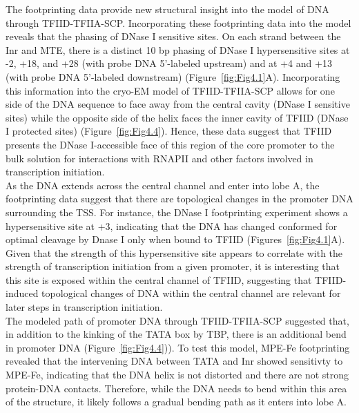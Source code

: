 \indent The footprinting data provide new structural insight into the model of DNA through TFIID-TFIIA-SCP. Incorporating these footprinting data into the model reveals that the phasing of DNase I sensitive sites. On each strand between the Inr and MTE, there is a distinct 10 bp phasing of DNase I hypersensitive sites at -2, +18, and +28 (with probe DNA 5’-labeled upstream) and at +4 and +13 (with probe DNA 5’-labeled downstream) (Figure~\ref{fig:Fig4.1}A).  Incorporating this information into the cryo-EM model of TFIID-TFIIA-SCP allows for one side of the DNA sequence to face away from the central cavity (DNase I sensitive sites) while the opposite side of the helix faces the inner cavity of TFIID (DNase I protected sites) (Figure~\ref{fig:Fig4.4}). Hence, these data suggest that TFIID presents the DNase I-accessible face of this region of the core promoter to the bulk solution for interactions with RNAPII and other factors involved in transcription initiation. \\
\indent As the DNA extends across the central channel and enter into lobe A, the footprinting data suggest that there are topological changes in the promoter DNA surrounding the TSS. For instance, the DNase I footprinting experiment shows a hypersensitive site at +3, indicating that the DNA has changed conformed for optimal cleavage by Dnase I only when bound to TFIID (Figures~\ref{fig:Fig4.1}A). Given that the strength of this hypersensitive site appears to correlate with the strength of transcription initiation from a given promoter, it is interesting that this site is exposed within the central channel of TFIID, suggesting that TFIID-induced topological changes of DNA within the central channel are relevant for later steps in transcription initiation. \\
\indent The modeled path of promoter DNA through TFIID-TFIIA-SCP suggested that, in addition to the kinking of the TATA box by TBP, there is an additional bend in promoter DNA (Figure~\ref{fig:Fig4.4})). To test this model, MPE-Fe footprinting revealed that the intervening DNA between TATA and Inr showed sensitivty to MPE-Fe, indicating that the DNA helix is not distorted and there are not strong protein-DNA contacts. Therefore, while the DNA needs to bend within this area of the structure, it likely follows a gradual bending path as it enters into lobe A.\\

